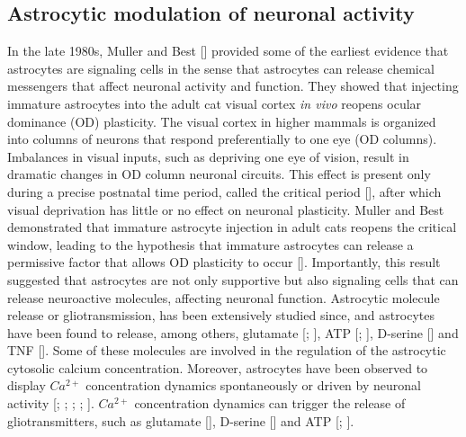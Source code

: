 \subsection{Astrocytic modulation of neuronal activity}
\label{chap1:sec:2:subsec3:astro_neuromodulation}
In the late 1980s, Muller and Best [\cite{muller1989ocular}] provided some of the earliest evidence that astrocytes are signaling cells in the sense that astrocytes can release chemical messengers that affect neuronal activity and function. 
They showed that injecting immature astrocytes into the adult cat visual cortex \textit{in vivo} reopens ocular dominance (OD) plasticity.
The visual cortex in higher mammals is organized into columns of neurons that respond preferentially to one eye (OD columns).
Imbalances in visual inputs, such as depriving one eye of vision, result in dramatic changes in OD column neuronal circuits. 
This effect is present only during a precise postnatal time period, called the critical period [\cite{wiesel1963single}], after which visual deprivation has little or no effect on neuronal plasticity.
Muller and Best demonstrated that immature astrocyte injection in adult cats reopens the critical window, leading to the hypothesis that immature astrocytes can release a permissive factor that allows OD plasticity to occur [\cite{muller1989ocular}].
Importantly, this result suggested that astrocytes are not only supportive but also signaling cells that can release neuroactive molecules, affecting neuronal function.
Astrocytic molecule release or gliotransmission, has been extensively studied since, and astrocytes have been found to release, among others, glutamate [\cite{parpura1994glutamate}; \cite{bezzi1998prostaglandins}], ATP [\cite{cotrina1998connexins}; \cite{coco2003storage}], D-serine [\cite{mothet2000d}] and TNF [\cite{stellwagen2006synaptic}].
Some of these molecules are involved in the regulation of the astrocytic cytosolic calcium concentration.
Moreover, astrocytes have been observed to display $Ca^{2+}$ concentration dynamics spontaneously or driven by neuronal activity [\cite{cornell-bell1990}; \cite{charles1991intercellular}; \cite{parri2001spontaneous}; \cite{stobart2018}; \cite{yumu2019glia}].
$Ca^{2+}$ concentration dynamics can trigger the release of gliotransmitters, such as glutamate [\cite{parpura1994glutamate}], D-serine [\cite{mothet2005glutamate}] and ATP [\cite{coco2003storage}; \cite{achour2012astrocyte}].

